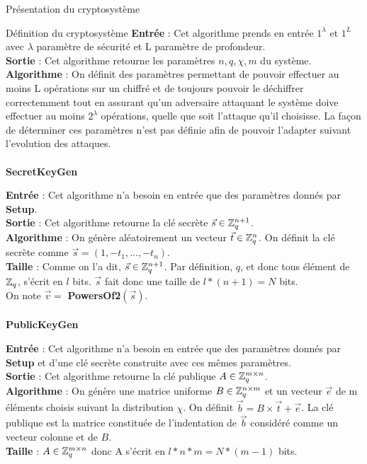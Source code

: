 \begin{section}{Présentation du cryptosystème}
\begin{subsection}{Définition du cryptosystème}
	\textbf{Entrée} : Cet algorithme prends en entrée $1^\lambda$ et $1^L$ avec $\lambda$ paramètre de sécurité et L paramètre de profondeur. \\
	\textbf{Sortie} : Cet algorithme retourne les paramètres $n, q, \chi, m$ du système. \\
	\textbf{Algorithme} : On définit des paramètres permettant de pouvoir effectuer au moins L opérations sur un chiffré et de toujours pouvoir le déchiffrer correctemment tout en assurant qu'un adversaire attaquant le système doive effectuer au moins $2^\lambda$ opérations, quelle que soit l'attaque qu'il choisisse. La façon de déterminer ces paramètres n'est pas définie afin de pouvoir l'adapter suivant l'evolution des attaques. \\
	
	\paragraph{}
	\textbf{SecretKeyGen}
	\flushleft
	
	\textbf{Entrée} : Cet algorithme n'a besoin en entrée que des paramètres donnés par \textbf{Setup}. \\
	\textbf{Sortie} : Cet algorithme retourne la clé secrète $\vec{s} \in \mathbb{Z}_q^{n+1}$. \\
	\textbf{Algorithme} : On génère aléatoirement un vecteur $\vec{t} \in \mathbb{Z}_q^n$. On définit la clé secrète comme $\vec{s} = (1, -t_1, ..., -t_n)$. \\
	\textbf{Taille} : Comme on l'a dit, $\vec{s} \in \mathbb{Z}_q^{n+1}$. Par définition, $q$, et donc tous élément de $\mathbb{Z}_q$, s'écrit en $l$ bits. $\vec{s}$ fait donc une taille de $l * (n+1) = N$ bits. \\
	On note $\vec{v} = $ \textbf{PowersOf2}$(\vec{s})$.
	
	\paragraph{}
	\textbf{PublicKeyGen}
	\flushleft
	
	\textbf{Entrée} : Cet algorithme n'a besoin en entrée que des paramètres donnés par \textbf{Setup} et d'une clé secrète construite avec ces mêmes paramètres. \\
	\textbf{Sortie} : Cet algorithme retourne la clé publique $A \in \mathbb{Z}_q^{m \times n}$.\\
	\textbf{Algorithme} : On génère une matrice uniforme $B \in \mathbb{Z}_q^{n \times m}$ et un vecteur $\vec{e}$ de m éléments choisis suivant la distribution $\chi$. On définit $\vec{b} = B \times \vec{t} + \vec{e}$. La clé publique est la matrice constituée de l'indentation de $\vec{b}$ considéré comme un vecteur colonne et de $B$. \\
	\textbf{Taille} : $A \in \mathbb{Z}_q^{m \times n}$ donc A s'écrit en $l * n * m = N * (m - 1)$ bits.
	

\end{subsection}
\end{section}
